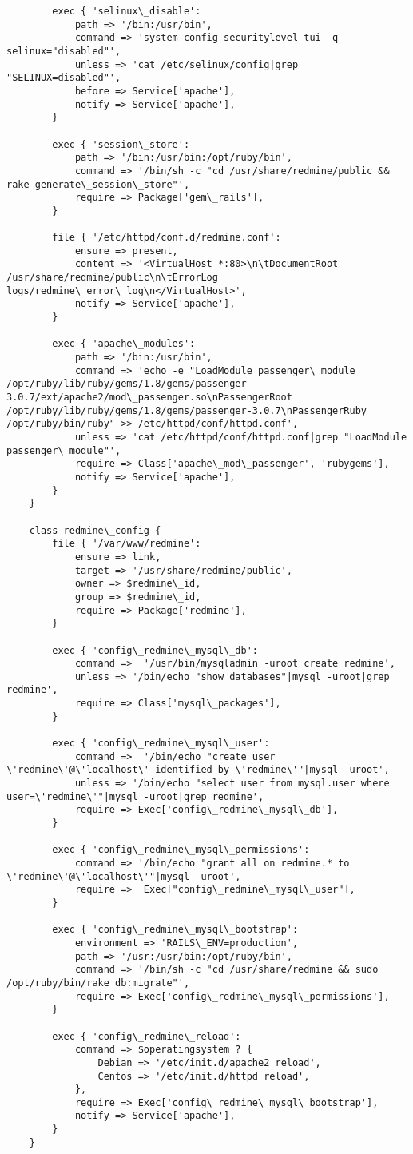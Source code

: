 \begin{verbatim}
		exec { 'selinux\_disable':
			path => '/bin:/usr/bin',
			command => 'system-config-securitylevel-tui -q --selinux="disabled"',
			unless => 'cat /etc/selinux/config|grep "SELINUX=disabled"',
			before => Service['apache'],
			notify => Service['apache'],
		}

		exec { 'session\_store':
			path => '/bin:/usr/bin:/opt/ruby/bin',
			command => '/bin/sh -c "cd /usr/share/redmine/public && rake generate\_session\_store"',
			require => Package['gem\_rails'],
		}

		file { '/etc/httpd/conf.d/redmine.conf':
			ensure => present,
			content => '<VirtualHost *:80>\n\tDocumentRoot /usr/share/redmine/public\n\tErrorLog logs/redmine\_error\_log\n</VirtualHost>',
			notify => Service['apache'],
		}

		exec { 'apache\_modules':
			path => '/bin:/usr/bin',
			command => 'echo -e "LoadModule passenger\_module /opt/ruby/lib/ruby/gems/1.8/gems/passenger-3.0.7/ext/apache2/mod\_passenger.so\nPassengerRoot /opt/ruby/lib/ruby/gems/1.8/gems/passenger-3.0.7\nPassengerRuby /opt/ruby/bin/ruby" >> /etc/httpd/conf/httpd.conf',
			unless => 'cat /etc/httpd/conf/httpd.conf|grep "LoadModule passenger\_module"',
			require => Class['apache\_mod\_passenger', 'rubygems'],
			notify => Service['apache'],
		}
	}

	class redmine\_config {
		file { '/var/www/redmine':
			ensure => link,
			target => '/usr/share/redmine/public',
			owner => $redmine\_id,
			group => $redmine\_id,
			require => Package['redmine'],
		}

		exec { 'config\_redmine\_mysql\_db':
			command =>  '/usr/bin/mysqladmin -uroot create redmine',
			unless => '/bin/echo "show databases"|mysql -uroot|grep redmine',
			require => Class['mysql\_packages'],
		}

		exec { 'config\_redmine\_mysql\_user':
			command =>  '/bin/echo "create user \'redmine\'@\'localhost\' identified by \'redmine\'"|mysql -uroot',
			unless => '/bin/echo "select user from mysql.user where user=\'redmine\'"|mysql -uroot|grep redmine',
			require => Exec['config\_redmine\_mysql\_db'],
		}

		exec { 'config\_redmine\_mysql\_permissions':
			command => '/bin/echo "grant all on redmine.* to \'redmine\'@\'localhost\'"|mysql -uroot',
			require =>  Exec["config\_redmine\_mysql\_user"],
		}

		exec { 'config\_redmine\_mysql\_bootstrap':
			environment => 'RAILS\_ENV=production',
			path => '/usr:/usr/bin:/opt/ruby/bin',
			command => '/bin/sh -c "cd /usr/share/redmine && sudo /opt/ruby/bin/rake db:migrate"',
			require => Exec['config\_redmine\_mysql\_permissions'],
		}

		exec { 'config\_redmine\_reload':
			command => $operatingsystem ? {
				Debian => '/etc/init.d/apache2 reload',
				Centos => '/etc/init.d/httpd reload',
			},
			require => Exec['config\_redmine\_mysql\_bootstrap'],
			notify => Service['apache'],
		}
	}
\end{verbatim}
